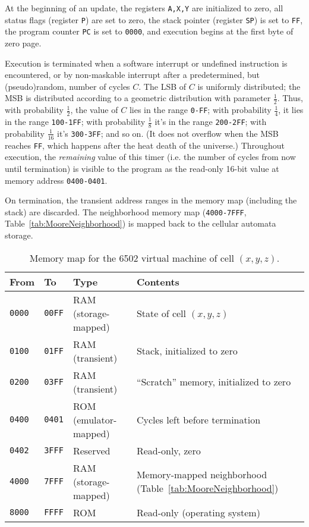\documentclass{article}
\newcommand\hex[1]{{\tt #1}}
\newcommand\hexrange[2]{\hex{#1}{\tt -}\hex{#2}}
\begin{document}
At the beginning of an update,
the registers {\tt A,X,Y} are initialized to zero,
all status flags (register {\tt P}) are set to zero,
the stack pointer (register {\tt SP}) is set to \hex{FF},
the program counter {\tt PC} is set to \hex{0000},
and execution begins at the first byte of zero page.

Execution is terminated
when a software interrupt or undefined instruction is encountered,
or by non-maskable interrupt after a predetermined, but (pseudo)random, number of cycles $C$.
The LSB of $C$ is uniformly distributed;
the MSB is distributed according to a geometric distribution with parameter $\frac{1}{2}$.
Thus, with probability $\frac{1}{2}$, the value of $C$ lies in the range \hexrange{0}{FF};
with probability $\frac{1}{4}$, it lies in the range \hexrange{100}{1FF};
with probability $\frac{1}{8}$ it's in the range \hexrange{200}{2FF};
with probability $\frac{1}{16}$ it's \hexrange{300}{3FF};
and so on.
(It does not overflow when the MSB reaches \hex{FF}, which happens after the heat death of the universe.)
Throughout execution, the {\em remaining} value of this timer
(i.e. the number of cycles from now until termination)
is visible to the program
as the read-only 16-bit value at memory address \hexrange{0400}{0401}.

On termination, the transient address ranges in the memory map
(including the stack)
are discarded.
The neighborhood memory map (\hexrange{4000}{7FFF}, Table~\ref{tab:MooreNeighborhood})
is mapped back to the cellular automata storage.

\begin{table}
\begin{tabular}{llll}
  \hline
  From & To & Type & Contents \\
  \hline
  \hex{0000} & \hex{00FF} & RAM (storage-mapped) & State of cell $(x,y,z)$ \\
  \hex{0100} & \hex{01FF} & RAM (transient) & Stack, initialized to zero \\
  \hex{0200} & \hex{03FF} & RAM (transient) & ``Scratch'' memory, initialized to zero \\
  \hex{0400} & \hex{0401} & ROM (emulator-mapped) & Cycles left before termination \\
  \hex{0402} & \hex{3FFF} & Reserved & Read-only, zero \\
  \hex{4000} & \hex{7FFF} & RAM (storage-mapped) & Memory-mapped neighborhood (Table~\ref{tab:MooreNeighborhood}) \\
  \hex{8000} & \hex{FFFF} & ROM & Read-only (operating system) \\
  \hline
\end{tabular}
\caption{
  \label{tab:MemoryMap}
  Memory map for the 6502 virtual machine of cell $(x,y,z)$.
}
\end{table}
\end{document}
